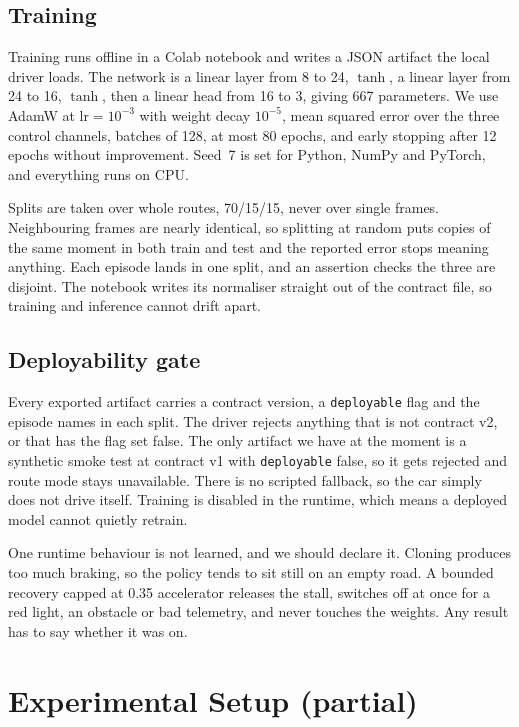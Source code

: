 \documentclass[conference]{IEEEtran}
\begin{document}
\subsection{Training}

Training runs offline in a Colab notebook and writes a JSON artifact the
local driver loads. The network is a linear layer from 8 to 24, $\tanh$,
a linear layer from 24 to 16, $\tanh$, then a linear head from 16 to 3,
giving 667 parameters. We use AdamW at $\mathrm{lr}=10^{-3}$ with weight
decay $10^{-5}$, mean squared error over the three control channels,
batches of 128, at most 80 epochs, and early stopping after 12 epochs
without improvement. Seed~7 is set for Python, NumPy and PyTorch, and
everything runs on CPU.

Splits are taken over whole routes, 70/15/15, never over single frames.
Neighbouring frames are nearly identical, so splitting at random puts
copies of the same moment in both train and test and the reported error
stops meaning anything. Each episode lands in one split, and an
assertion checks the three are disjoint. The notebook writes its
normaliser straight out of the contract file, so training and inference
cannot drift apart.

\subsection{Deployability gate}

Every exported artifact carries a contract version, a
\texttt{deployable} flag and the episode names in each split. The driver
rejects anything that is not contract v2, or that has the flag set
false. The only artifact we have at the moment is a synthetic smoke test
at contract v1 with \texttt{deployable} false, so it gets rejected and
route mode stays unavailable. There is no scripted fallback, so the car
simply does not drive itself. Training is disabled in the runtime, which
means a deployed model cannot quietly retrain.

One runtime behaviour is not learned, and we should declare it. Cloning
produces too much braking, so the policy tends to sit still on an empty
road. A bounded recovery capped at 0.35 accelerator releases the stall,
switches off at once for a red light, an obstacle or bad telemetry, and
never touches the weights. Any result has to say whether it was on.

\section{Experimental Setup (partial)}
\end{document}
